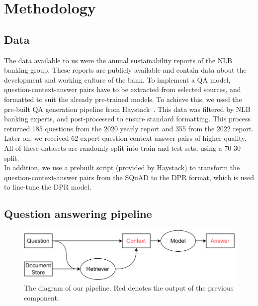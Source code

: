 \documentclass[fleqn,moreauthors,10pt]{ds_report}
\begin{document}
\section*{Methodology}
\subsection*{Data}
The data available to us were the annual sustainability reports of the NLB banking group.
These reports are publicly available and contain data about the development and working culture of the bank.
To implement a QA model, question-context-answer pairs have to be extracted from selected sources, and formatted to suit the already pre-trained models.
To achieve this, we used the pre-built QA generation pipeline from Haystack~\cite{haystack}.
This data was filtered by NLB banking experts, and post-processed to ensure standard formatting.
This process returned 185 questions from the 2020 yearly report and 355 from the 2022 report.
Later on, we received 62 expert question-context-answer pairs of higher quality.
All of these datasets are randomly split into train and test sets, using a 70-30 split. \\
In addition, we use a prebuilt script (provided by Haystack) to transform the question-context-answer pairs from the SQ\-uAD to the DPR format, which is used to fine-tune the DPR model.

\subsection*{Question answering pipeline}

\begin{figure}[hbt]\centering
	\includegraphics[width=0.9\linewidth]{fig/model_diagram.pdf}
	\caption{The diagram of our pipeline. Red denotes the output of the previous component.}
	\label{fig:pipeline}
\end{figure}
\end{document}
